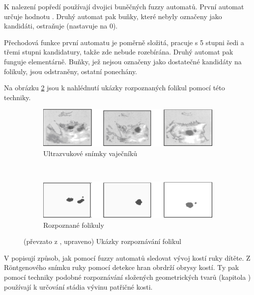 \documentclass[a4paper,10pt]{article}
\begin{document}
K nalezení popředí používají dvojici buněčných fuzzy automatů. První automat určuje hodnotu . Druhý automat pak buňky, které nebyly označeny jako kandidáti, ostraňuje (nastavuje na $0$).

Přechodová funkce první automatu je poměrně složitá, pracuje s 5 stupni šedi a třemi stupni kandidatury, takže zde nebude rozebírána. Druhý automat pak funguje elementárně. Buňky, jež nejsou označeny jako dostatečné kandidáty na folikuly, jsou odstraněny, ostatní ponechány.
 
Na obrázku \ref{img:Follicles} jsou k nahlédnutí ukázky rozpoznaných folikul pomocí této techniky.

\begin{figure}
  \begin{subfigure}[t]{\textwidth} \centering
    \includegraphics[width=\textwidth]{follicles-1}
    \caption{Ultrazvukové snímky vaječníků} \label{img:Follicles:Screens}
  \end{subfigure}
  \\
  \begin{subfigure}[t]{\textwidth} \centering
    \includegraphics[width=\textwidth]{follicles-2}
    \caption{Rozpoznané folikuly}
  \end{subfigure}
 
  \caption{(převzato z \cite{WanJiaZhoDu-ImProcBasFuzCelAuMod}, upraveno) Ukázky rozpoznávání folikul} \label{img:Follicles}
\end{figure}


V \cite{PatPal-FuzGraSynRecSkeMatXra} popisují způsob, jak pomocí fuzzy automatů sledovat vývoj kostí ruky dítěte. Z Röntgenového snímku ruky pomocí detekce hran obrdrží obrysy kostí. Ty pak pomocí techniky podobné rozpoznávání složených geometrických tvarů (kapitola ) používají k určování stádia vývinu patřičné kosti.
\end{document}
